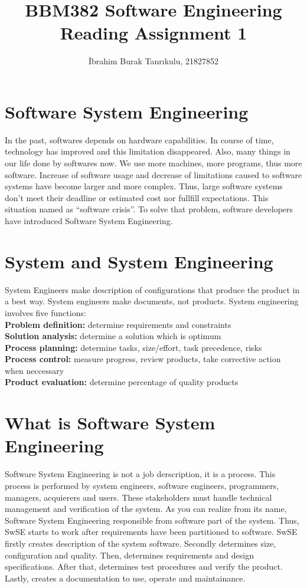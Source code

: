 \documentclass[11pt]{article}
\author{İbrahim Burak Tanrıkulu, 21827852}
\title{BBM382 Software Engineering\\Reading Assignment 1}
\begin{document}
\maketitle

\section{Software System Engineering}
In the past, softwares depends on hardware capabilities. In course of time, technology has improved and this limitation disappeared. Also, many things in our life done by softwares now. We use more machines, more programs, thus more software.  Increase of software usage and decrease of limitations caused to software systems have become larger and more complex. Thus, large software systems don’t meet their deadline or estimated cost nor fullfill expectations. This situation named as “software crisis”. To solve that problem, software developers have introduced Software System Engineering. 

\section{System and System Engineering}
System Engineers make description of configurations that produce the product in a best way. System engineers make documents, not products. 
System engineering involves five functions:\\
{\bf Problem definition:} determine requirements and constraints\\
{\bf Solution analysis:} determine a solution which is optimum\\
{\bf Process planning:} determine tasks, size/effort, task precedence, risks\\
{\bf Process control:} measure progress, review products, take corrective action when neccessary\\
{\bf Product evaluation:} determine percentage of quality products

\section{What is Software System Engineering}
Software System Engineering is not a job derscription, it is a process. This process is performed by system engineers, software engineers, programmers, managers, acquierers and users. These stakeholders must handle technical management and verification of the system. As you can realize from its name, Software System Engineering responsible from software part of the system. Thus, SwSE starts to work after requirements have been partitioned to software. SwSE firstly creates description of the system software. Secondly determines size, configuration and quality. Then, determines requirements and design specifications. After that, determines test procedures and verify the product. Lastly, creates a documentation to use, operate and maintainance.
\end{document}
